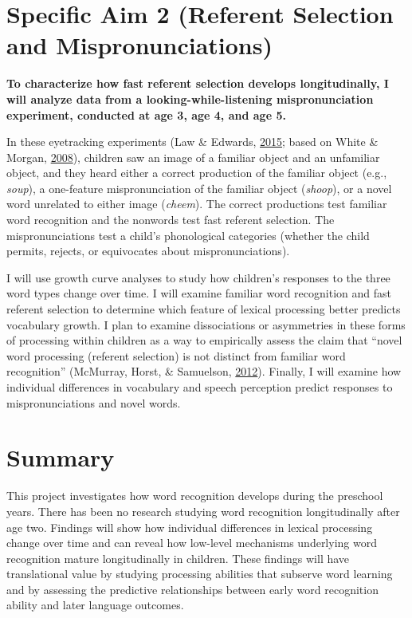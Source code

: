 \documentclass [11pt, proquest] {uwthesis}[2015/03/03]
\begin{document}
\section{Specific Aim 2 (Referent Selection and
Mispronunciations)}\label{specific-aim-2-referent-selection-and-mispronunciations}

\textbf{To characterize how fast referent selection develops
longitudinally, I will analyze data from a looking-while-listening
mispronunciation experiment, conducted at age 3, age 4, and age 5.}

In these eyetracking experiments (Law \& Edwards,
\protect\hyperlink{ref-MPPaper}{2015}; based on White \& Morgan,
\protect\hyperlink{ref-WhiteMorgan2008}{2008}), children saw an image of
a familiar object and an unfamiliar object, and they heard either a
correct production of the familiar object (e.g., \emph{soup}), a
one-feature mispronunciation of the familiar object (\emph{shoop}), or a
novel word unrelated to either image (\emph{cheem}). The correct
productions test familiar word recognition and the nonwords test fast
referent selection. The mispronunciations test a child's phonological
categories (whether the child permits, rejects, or equivocates about
mispronunciations).

I will use growth curve analyses to study how children's responses to
the three word types change over time. I will examine familiar word
recognition and fast referent selection to determine which feature of
lexical processing better predicts vocabulary growth. I plan to examine
dissociations or asymmetries in these forms of processing within
children as a way to empirically assess the claim that ``novel word
processing (referent selection) is not distinct from familiar word
recognition'' (McMurray, Horst, \& Samuelson,
\protect\hyperlink{ref-McMurray2012}{2012}). Finally, I will examine how
individual differences in vocabulary and speech perception predict
responses to mispronunciations and novel words.

\section{Summary}\label{summary}

This project investigates how word recognition develops during the
preschool years. There has been no research studying word recognition
longitudinally after age two. Findings will show how individual
differences in lexical processing change over time and can reveal how
low-level mechanisms underlying word recognition mature longitudinally
in children. These findings will have translational value by studying
processing abilities that subserve word learning and by assessing the
predictive relationships between early word recognition ability and
later language outcomes.
\end{document}
